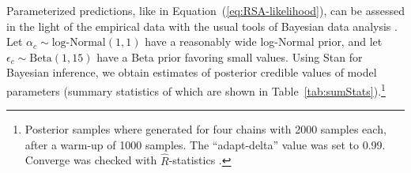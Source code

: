 \documentclass[fleqn]{article}
\begin{document}
Parameterized predictions, like in Equation~(\ref{eq:RSA-likelihood}), can be assessed in the light of the empirical data with the usual tools of Bayesian data analysis \citep[e.g.][]{GelmanCarlin2014:Bayesian-Data-A,McElreath2016:Statistical-Ret,Lambert2018:A-Students-Guid}.
Let $\alpha_{c}\sim \text{log-Normal}(1,1)$ have a reasonably wide log-Normal prior, and let $\epsilon_{c} \sim \text{Beta}(1,15)$ have a Beta prior favoring small values.
Using Stan \citep{Team2023:The-Stan-Core-L} for Bayesian inference, we obtain estimates of posterior credible values of model parameters (summary statistics of which are shown in Table~\ref{tab:sumStats}).\footnote{
  Posterior samples where generated for four chains with 2000 samples each, after a warm-up of 1000 samples. The ``adapt-delta'' value was set to 0.99. Converge was checked with $\hat{R}$-statistics \citep{GelmanRubin1992:Inference-from-}.
}
\end{document}
